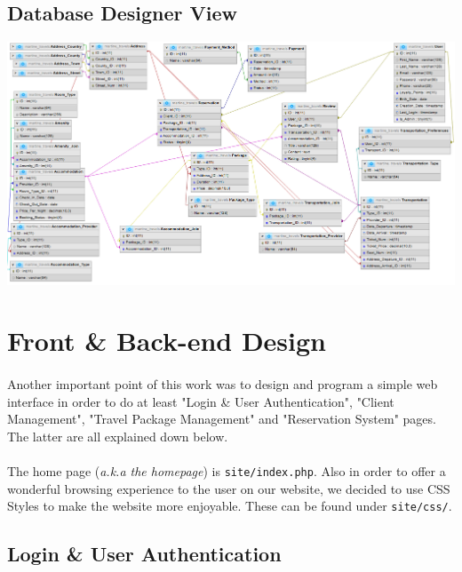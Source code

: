 \documentclass[11pt,a4paper,titlepage]{article}
\begin{document}
\subsection{Database Designer View}
\includegraphics[scale=0.7,angle=90]{diag_2.png}

\section{Front \& Back-end Design}
\paragraph{} 
Another important point of this work was to design and program a simple web interface in order to do at least "Login \& User Authentication", "Client Management", "Travel Package Management" and "Reservation System" pages. The latter are all explained down below.

\paragraph{}
The home page (\textit{a.k.a the homepage}) is \verb|site/index.php|. Also in order to offer a wonderful browsing experience to the user on our website, we decided to use CSS Styles to make the website more enjoyable. These can be found under \verb|site/css/|.

\subsection{Login \& User Authentication}
\end{document}

